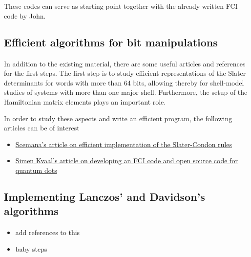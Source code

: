 \documentclass[%
oneside,                 %
final,                   %
10pt]{article}
\begin{document}
\noindent
These codes can serve as starting point together with the already written FCI code by John.



\subsection{Efficient algorithms for bit manipulations}

\paragraph{}
In addition to the existing material, there are some useful articles and references for the first steps. 
The first step is to study efficient representations of the Slater determinants for words with more than 64 bits, allowing thereby for shell-model studies 
of systems with more than one major shell. Furthermore, the setup of the Hamiltonian matrix elements plays an important role. 

In order to study these aspects and write an efficient program, the following articles can be of interest
\begin{itemize}
\item \href{{http://arxiv.org/abs/1311.6244}}{Scemana's article on efficient implementation of the Slater-Condon rules}

\item \href{{http://arxiv.org/abs/0810.2644}}{Simen Kvaal's article on developing an FCI code and open source code for quantum dots}
\end{itemize}

\noindent





\subsection{Implementing Lanczos' and Davidson's algorithms}

\paragraph{}
\begin{itemize}
\item add references to this

\item baby steps
\end{itemize}
\end{document}
